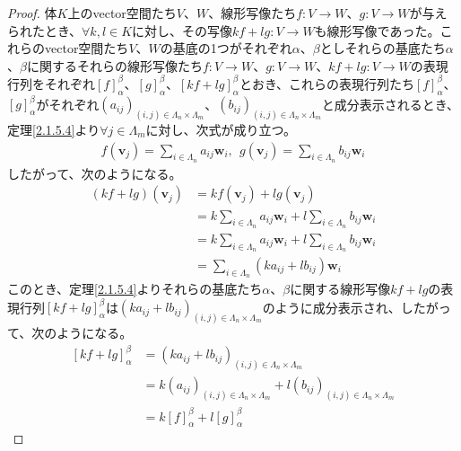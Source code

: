\documentclass[dvipdfmx]{jsarticle}
\begin{document}
\begin{proof}
体$K$上のvector空間たち$V$、$W$、線形写像たち$f:V \rightarrow W$、$g:V \rightarrow W$が与えられたとき、$\forall k,l \in K$に対し、その写像$kf + lg:V \rightarrow W$も線形写像であった。これらのvector空間たち$V$、$W$の基底の1つがそれぞれ$\alpha$、$\beta$としそれらの基底たち$\alpha$、$\beta$に関するそれらの線形写像たち$f:V \rightarrow W$、$g:V \rightarrow W$、$kf + lg:V \rightarrow W$の表現行列をそれぞれ$[ f]^{\beta}_{\alpha}$、$[ g]^{\beta}_{\alpha}$、$[ kf + lg]^{\beta}_{\alpha}$とおき、これらの表現行列たち$[ f]^{\beta}_{\alpha}$、$[ g]^{\beta}_{\alpha}$がそれぞれ$\left( a_{ij} \right)_{(i,j) \in \varLambda_{n} \times \varLambda_{m}}$、$\left( b_{ij} \right)_{(i,j) \in \varLambda_{n} \times \varLambda_{m}}$と成分表示されるとき、定理\ref{2.1.5.4}より$\forall j \in \varLambda_{m}$に対し、次式が成り立つ。
\begin{align*}
f\left( \mathbf{v}_{j} \right) = \sum_{i \in \varLambda_{n}} {a_{ij}\mathbf{w}_{i}},\ \ g\left( \mathbf{v}_{j} \right) = \sum_{i \in \varLambda_{n}} {b_{ij}\mathbf{w}_{i}}
\end{align*}
したがって、次のようになる。
\begin{align*}
\left( kf + lg \right)\left( \mathbf{v}_{j} \right) &= kf\left( \mathbf{v}_{j} \right) + lg\left( \mathbf{v}_{j} \right)\\
&= k\sum_{i \in \varLambda_{n}} {a_{ij}\mathbf{w}_{i}} + l\sum_{i \in \varLambda_{n}} {b_{ij}\mathbf{w}_{i}}\\
&= k\sum_{i \in \varLambda_{n}} {a_{ij}\mathbf{w}_{i}} + l\sum_{i \in \varLambda_{n}} {b_{ij}\mathbf{w}_{i}}\\
&= \sum_{i \in \varLambda_{n}} {\left( ka_{ij} + lb_{ij} \right)\mathbf{w}_{i}}
\end{align*}
このとき、定理\ref{2.1.5.4}よりそれらの基底たち$\alpha$、$\beta$に関する線形写像$kf + lg$の表現行列$[ kf + lg]^{\beta}_{\alpha}$は$\left( ka_{ij} + lb_{ij} \right)_{(i,j) \in \varLambda_{n} \times \varLambda_{m}}$のように成分表示され、したがって、次のようになる。
\begin{align*}
\left[ kf + lg \right]^{\beta}_{\alpha} &= \left( ka_{ij} + lb_{ij} \right)_{(i,j) \in \varLambda_{n} \times \varLambda_{m}}\\
&= k\left( a_{ij} \right)_{(i,j) \in \varLambda_{n} \times \varLambda_{m}} + l\left( b_{ij} \right)_{(i,j) \in \varLambda_{n} \times \varLambda_{m}}\\
&= k[ f]^{\beta}_{\alpha} + l[ g]^{\beta}_{\alpha}
\end{align*}
\end{proof}
\end{document}
